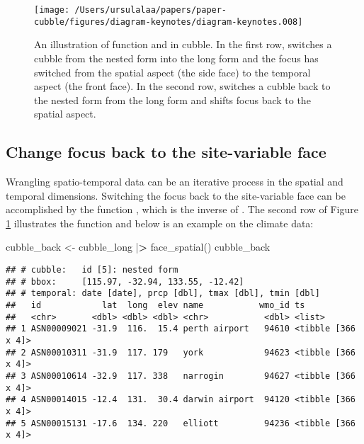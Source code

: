 \documentclass{article}
\newenvironment{Shaded}{\begin{snugshade}}{\end{snugshade}}
\newcommand{\ErrorTok}[1]{\textcolor[rgb]{0.64,0.00,0.00}{\textbf{#1}}}
\newcommand{\FunctionTok}[1]{\textcolor[rgb]{0.00,0.00,0.00}{#1}}
\newcommand{\NormalTok}[1]{#1}
\newcommand{\OtherTok}[1]{\textcolor[rgb]{0.56,0.35,0.01}{#1}}
\newcommand{\SpecialCharTok}[1]{\textcolor[rgb]{0.00,0.00,0.00}{#1}}
\begin{document}
\begin{figure}

{\centering \texttt{[image: /Users/ursulalaa/papers/paper-cubble/figures/diagram-keynotes/diagram-keynotes.008]} 

}

\caption{An illustration of function  and  in cubble. In the first row,  switches a cubble from the nested form into the long form and the focus has switched from the spatial aspect (the side face) to the temporal aspect (the front face). In the second row,  switches a cubble back to the nested form from the long form and shifts focus back to the spatial aspect.}\label{fig:face}
\end{figure}

\hypertarget{change-focus-back-to-the-site-variable-face}{%
\subsection{Change focus back to the site-variable face}\label{change-focus-back-to-the-site-variable-face}}

Wrangling spatio-temporal data can be an iterative process in the spatial and temporal dimensions. Switching the focus back to the site-variable face can be accomplished by the function , which is the inverse of . The second row of Figure \ref{fig:face} illustrates the function and below is an example on the climate data:

\begin{Shaded}
\begin{Highlighting}[]
\NormalTok{cubble\_back }\OtherTok{\textless{}{-}}\NormalTok{ cubble\_long }\SpecialCharTok{|}\ErrorTok{\textgreater{}} \FunctionTok{face\_spatial}\NormalTok{()}
\NormalTok{cubble\_back}
\end{Highlighting}
\end{Shaded}

\begin{verbatim}
## # cubble:   id [5]: nested form
## # bbox:     [115.97, -32.94, 133.55, -12.42]
## # temporal: date [date], prcp [dbl], tmax [dbl], tmin [dbl]
##   id            lat  long  elev name           wmo_id ts                
##   <chr>       <dbl> <dbl> <dbl> <chr>           <dbl> <list>            
## 1 ASN00009021 -31.9  116.  15.4 perth airport   94610 <tibble [366 x 4]>
## 2 ASN00010311 -31.9  117. 179   york            94623 <tibble [366 x 4]>
## 3 ASN00010614 -32.9  117. 338   narrogin        94627 <tibble [366 x 4]>
## 4 ASN00014015 -12.4  131.  30.4 darwin airport  94120 <tibble [366 x 4]>
## 5 ASN00015131 -17.6  134. 220   elliott         94236 <tibble [366 x 4]>
\end{verbatim}
\end{document}
